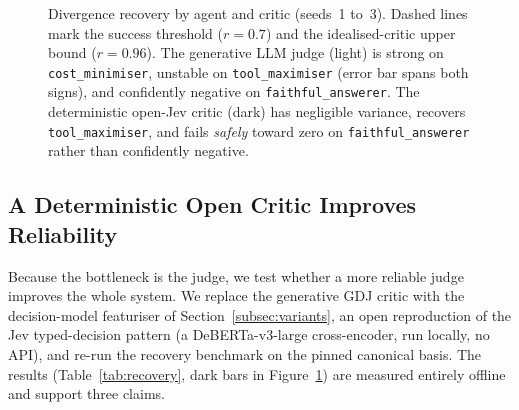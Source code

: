 \begin{figure}[h]
\centering
{}
\caption{Divergence recovery by agent and critic (seeds~1 to~3). Dashed lines mark
the success threshold ($r = 0.7$) and the idealised-critic upper bound ($r = 0.96$).
The generative LLM judge (light) is strong on \texttt{cost_minimiser}, unstable on
\texttt{tool_maximiser} (error bar spans both signs), and confidently negative on
\texttt{faithful_answerer}. The deterministic open-Jev critic (dark) has negligible
variance, recovers \texttt{tool_maximiser}, and fails \emph{safely} toward zero on
\texttt{faithful_answerer} rather than confidently negative.}
\label{fig:recovery}
\end{figure}

\subsection{A Deterministic Open Critic Improves Reliability}
\label{subsec:jev}
Because the bottleneck is the judge, we test whether a more reliable judge improves
the whole system. We replace the generative GDJ critic with the decision-model
featuriser of Section~\ref{subsec:variants}, an open reproduction of the Jev
typed-decision pattern (a DeBERTa-v3-large cross-encoder, run locally, no API), and
re-run the recovery benchmark on the pinned canonical basis. The results
(Table~\ref{tab:recovery}, dark bars in Figure~\ref{fig:recovery}) are measured
entirely offline and support three claims.


